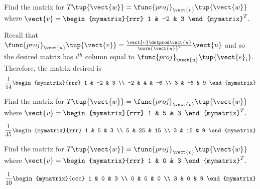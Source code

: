 \begin{enumialphparenastyle}
\begin{ex}  Find the matrix for $T\tup{\vect{w} } = \func{proj}_{\vect{v}}\tup{\vect{w}} $
where $\vect{v}=\begin{mymatrix}{rrr}
1 & -2 & 3
\end{mymatrix} ^{T}.$
\begin{sol}
 Recall that $\func{proj}_{\vect{u}}\tup{\vect{v}} =\frac{\vect{v}\dotprod\vect{u} }{\norm{\vect{u}} ^{2}}\vect{u}$ and so the desired matrix
has $i^{th}$ column equal to $\func{proj}_{\vect{u}}\tup{\vect{e}_{i}} .$ Therefore, the matrix desired is
\[
\frac{1}{14}\begin{mymatrix}{rrr}
1 & -2 & 3 \\
-2 & 4 & -6 \\
3 & -6 & 9
\end{mymatrix}
\]
\end{sol}
\end{ex}

\begin{ex}  Find the matrix for $T\tup{\vect{w} } = \func{proj}_{\vect{v}}\tup{\vect{w}} $
where $\vect{v}=\begin{mymatrix}{rrr}
1 & 5 & 3
\end{mymatrix} ^{T}.$
\begin{sol}
\[
\frac{1}{35}\begin{mymatrix}{rrr}
1 & 5 & 3 \\
5 & 25 & 15 \\
3 & 15 & 9
\end{mymatrix}
\]
\end{sol}
\end{ex}

\begin{ex} Find the matrix for $T\tup{\vect{w} } = \func{proj}_{\vect{v}}\tup{\vect{w}} $
where $\vect{v}=\begin{mymatrix}{rrr}
1 & 0 & 3
\end{mymatrix} ^{T}.$ 
\begin{sol}
\[
\frac{1}{10}\begin{mymatrix}{ccc}
1 & 0 & 3 \\
0 & 0 & 0 \\
3 & 0 & 9
\end{mymatrix}
\]
\end{sol}
\end{ex}


\end{enumialphparenastyle}
